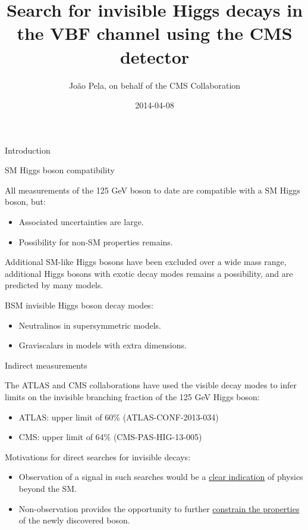 \documentclass[8pt]{beamer}
\author[J. Pela]{João Pela, on behalf of the CMS Collaboration}
\title[Search for VBF Higgs $\rightarrow$ Inv at CMS]{Search for invisible Higgs decays in the VBF channel using the CMS detector}
\institute[ICL]{Imperial College London}
\date{2014-04-08}
\newcommand\Fontvi{\fontsize{6}{7.2}\selectfont}
\begin{document}
\setlength{\unitlength}{1mm}

\begin{frame}
  \titlepage
\end{frame}

\begin{frame}{Introduction}
\Fontvi
 
\begin{block}{SM Higgs boson compatibility}
 
All measurements of the 125 GeV boson to date are compatible with a SM Higgs boson, but:
\begin{itemize}
 \item Associated uncertainties are large.
 \item Possibility for non-SM properties remains.
\end{itemize}

Additional SM-like Higgs bosons have been excluded over a wide mass range, additional Higgs bosons with exotic decay modes remains a possibility, and are predicted by many models.

\end{block}

\begin{block}{BSM invisible Higgs boson decay modes:}

\begin{itemize}
 \item Neutralinos in supersymmetric models.
 \item Graviscalars in models with extra dimensions. 
\end{itemize}

\end{block}

\begin{block}{Indirect measurements}

The ATLAS and CMS collaborations have used the visible decay modes to infer limits on the invisible branching fraction of the 125 GeV Higgs boson:
\begin{itemize}
 \item ATLAS: upper limit of 60\% (ATLAS-CONF-2013-034) 
 \item CMS: upper limit of 64\% (CMS-PAS-HIG-13-005)
\end{itemize}

\end{block}

\begin{block}{Motivations for direct searches for invisible decays:}

\begin{itemize}
 \item Observation of a signal in such searches would be a \uline{clear indication} of physics beyond the SM.
 \item Non-observation provides the opportunity to further \uline{constrain the properties} of the newly discovered boson.
\end{itemize}

\end{block}
 
\end{frame}
\end{document}
